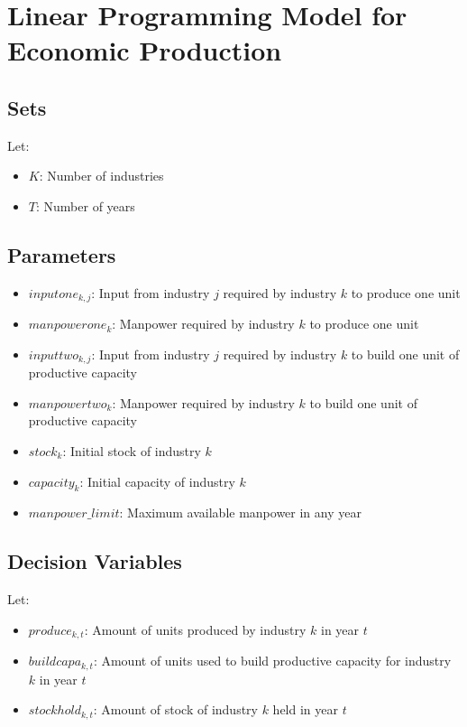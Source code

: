 \documentclass{article}
\begin{document}
\section*{Linear Programming Model for Economic Production}

\subsection*{Sets}
Let:
\begin{itemize}
    \item $K$: Number of industries
    \item $T$: Number of years
\end{itemize}

\subsection*{Parameters}
\begin{itemize}
    \item $inputone_{k,j}$: Input from industry $j$ required by industry $k$ to produce one unit
    \item $manpowerone_{k}$: Manpower required by industry $k$ to produce one unit
    \item $inputtwo_{k,j}$: Input from industry $j$ required by industry $k$ to build one unit of productive capacity
    \item $manpowertwo_{k}$: Manpower required by industry $k$ to build one unit of productive capacity
    \item $stock_{k}$: Initial stock of industry $k$
    \item $capacity_{k}$: Initial capacity of industry $k$
    \item $manpower\_limit$: Maximum available manpower in any year
\end{itemize}

\subsection*{Decision Variables}
Let:
\begin{itemize}
    \item $produce_{k,t}$: Amount of units produced by industry $k$ in year $t$
    \item $buildcapa_{k,t}$: Amount of units used to build productive capacity for industry $k$ in year $t$
    \item $stockhold_{k,t}$: Amount of stock of industry $k$ held in year $t$
\end{itemize}
\end{document}
